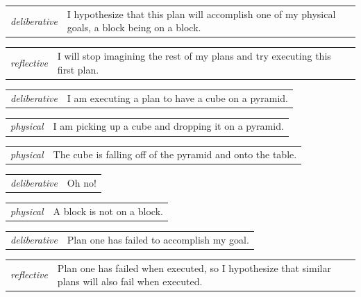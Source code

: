 \begin{tabular}{p{2cm}p{8cm}}
  {\emph{deliberative}} & I hypothesize that this plan will accomplish
  one of my physical goals, a block being on a block. \\
\end{tabular}

\begin{tabular}{p{2cm}p{8cm}}
  {\emph{reflective}} & I will stop imagining the rest of my plans and
  try executing this first plan. \\
\end{tabular}

\begin{tabular}{p{2cm}p{8cm}}
  {\emph{deliberative}} & I am executing a plan to have a cube on a
  pyramid. \\
\end{tabular}

\begin{tabular}{p{2cm}p{8cm}}
  {\emph{physical}} & I am picking up a cube and dropping it on a
  pyramid. \\
\end{tabular}

\begin{tabular}{p{2cm}p{8cm}}
  {\emph{physical}} & The cube is falling off of the pyramid and onto
  the table. \\
\end{tabular}

\begin{tabular}{p{2cm}p{8cm}}
  {\emph{deliberative}} & Oh no! \\
\end{tabular}

\begin{tabular}{p{2cm}p{8cm}}
  {\emph{physical}} & A block is not on a block. \\
\end{tabular}

\begin{tabular}{p{2cm}p{8cm}}
  {\emph{deliberative}} & Plan one has failed to accomplish my
  goal. \\
\end{tabular}

\begin{tabular}{p{2cm}p{8cm}}
  {\emph{reflective}} & Plan one has failed when executed, so I
  hypothesize that similar plans will also fail when executed. \\
\end{tabular}

